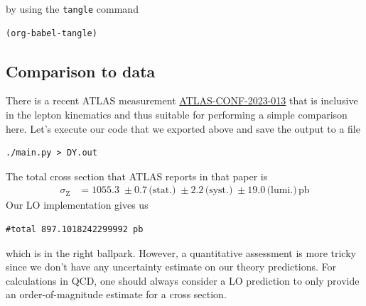 \documentclass[11pt]{article}
\begin{document}
by using the \texttt{tangle} command
\begin{verbatim}
(org-babel-tangle)
\end{verbatim}
\subsection{Comparison to data}
\label{sec:org1b74f6a}
There is a recent ATLAS measurement \href{https://atlas.web.cern.ch/Atlas/GROUPS/PHYSICS/CONFNOTES/ATLAS-CONF-2023-013/}{ATLAS-CONF-2023-013} that is inclusive in the lepton kinematics and thus suitable for performing a simple comparison here.
Let's execute our code that we exported above and save the output to a file
\begin{verbatim}
./main.py > DY.out
\end{verbatim}
The total cross section that ATLAS reports in that paper is
\begin{align}
  \sigma_\mathrm{Z}
  &=
  1055.3 \;\pm 0.7 \,\text{(stat.)} \;\pm 2.2 \,\text{(syst.)} \;\pm 19.0 \,\text{(lumi.)} \,\mathrm{pb}
\end{align}
Our LO implementation gives us
\label{}
\begin{verbatim}
#total 897.1018242299992 pb
\end{verbatim}

which is in the right ballpark.
However, a quantitative assessment is more tricky since we don't have any uncertainty estimate on our theory predictions.
For calculations in QCD, one should always consider a LO prediction to only provide an order-of-magnitude estimate for a cross section.
\end{document}
